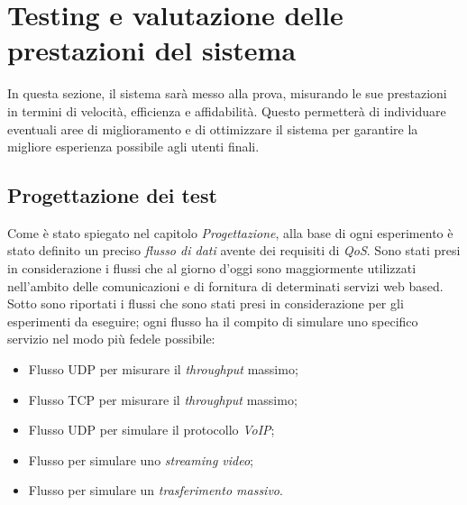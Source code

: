 \chapter{Testing e valutazione delle prestazioni del sistema} 

\begin{citazione}
In questa sezione, il sistema sarà messo alla prova, misurando le sue prestazioni in termini di velocità, efficienza e affidabilità. Questo permetterà di individuare eventuali aree di miglioramento e di ottimizzare il sistema per garantire la migliore esperienza possibile agli utenti finali.
\end{citazione}
\newpage

\section{Progettazione dei test}
Come è stato spiegato nel capitolo \emph{Progettazione}, alla base di ogni esperimento è stato definito un preciso \emph{flusso di dati} avente dei requisiti di \emph{QoS}. Sono stati presi in considerazione i flussi che al giorno d'oggi sono maggiormente utilizzati nell'ambito delle comunicazioni e di fornitura di determinati servizi web based. Sotto sono riportati i flussi che sono stati presi in considerazione per gli esperimenti da eseguire; ogni flusso ha il compito di simulare uno specifico servizio nel modo più fedele possibile: 
\newline
\begin{itemize}
    \item Flusso UDP per misurare il \emph{throughput} massimo;
    \item Flusso TCP per misurare il \emph{throughput} massimo;
    \item Flusso UDP per simulare il protocollo \emph{VoIP};
    \item Flusso per simulare uno \emph{streaming video};
    \item Flusso per simulare un \emph{trasferimento massivo}.
\end{itemize} 


